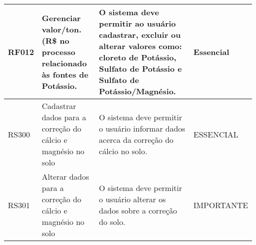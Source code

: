 \begin{table}
\begin{tabular}{|p{2cm}|p{4cm}|p{6cm}|p{2cm}|}
\hline
RF012 & Gerenciar valor/ton. (R\$ no processo relacionado às fontes de Potássio.         & O sistema deve permitir ao usuário cadastrar, excluir ou alterar valores como: cloreto de Potássio, Sulfato de Potássio e Sulfato de Potássio/Magnésio.                                                                                                                                        & Essencial   \\ 
\hline
RS300 & Cadastrar dados para a correção do cálcio e magnésio no solo                     & O sistema deve permitir o usuário informar dados acerca da correção do cálcio no solo.                                                                                                                                                                                                         & ESSENCIAL   \\ 
\hline
RS301 & Alterar dados para a correção do cálcio e magnésio no solo                       & O sistema deve permitir o usuário alterar os dados sobre a correção do solo.                                                                                                                                                                                                                   & IMPORTANTE  \\ 
\hline



\end{tabular}
\end{table}
